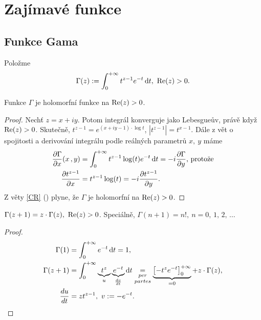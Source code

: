 
\section{Zajímavé funkce}
\setcounter{equation}{0}
\subsection{Funkce Gama}

\begin{definition}
Položme 
\begin{equation}\label{eqn:gamma}
    \Gamma (z) := \int_0^{+\infty}t^{z-1}e^{-t} \diff t,\ \Rel(z)>0.
\end{equation} 
\end{definition}

\begin{lemma}
Funkce $\Gamma$ je holomorfní funkce na $\operatorname{Re}(z)>0$.
\end{lemma}

\begin{proof}
  Nechť $z=x+iy$. Potom integrál konverguje jako Lebesgueův, právě když $\operatorname{Re}(z)>0$. Skutečně, $t^{z-1}=e^{(x+iy-1)\cdot \log t}$, $|t^{z-1}|=t^{x-1}$. Dále z vět o spojitosti a derivování integrálu podle reálných parametrů $x,\ y$ máme
\begin{align*}
   \frac{\partial \Gamma}{\partial x}(x\,,y)&=\int_0^{+\infty}t^{z-1}\log (t) e^{-t} \mathop{}\!\mathrm{d} t=-i \frac{\partial \Gamma}{\partial y}\text{, protože}\\
   \frac{\partial t^{z-1}}{\partial x}&=t^{z-1}\log (t)=-i \frac{\partial t^{z-1}}{\partial y}\text{.}
\end{align*}
  Z věty \ref{CR} () plyne, že $\Gamma$ je holomorfní na $\operatorname{Re}(z)>0$.
 \end{proof}
 
\begin{lemma}\label{lemma:gammaIter}
$\Gamma(z+1)=z\cdot\Gamma(z),\ \operatorname{Re}(z)>0$. Speciálně, $\Gamma(n+1)=n!,\ n=0,\,1,\,2,\,\ldots$ 
\end{lemma}

\begin{proof}
\begin{align*}
    \Gamma(1)&=\int_0^{+\infty}e^{-t}\mathop{}\!\mathrm{d} t=1,\\
    \Gamma(z+1)&=\int_0^{+\infty}\underbrace{t^z}_u \underbrace{e^{-t}}_{\frac{dv}{dt}}\mathop{}\!\mathrm{d} t \underset{partes}{\underset{per}{=}} \underbrace{\left[-t^z e^{-t}\right]_0^{+\infty}}_{=0}+z\cdot\Gamma(z),\\
    \frac{du}{dt}&=zt^{z-1},\ v:=-e^{-t}.
\end{align*}
\end{proof}

